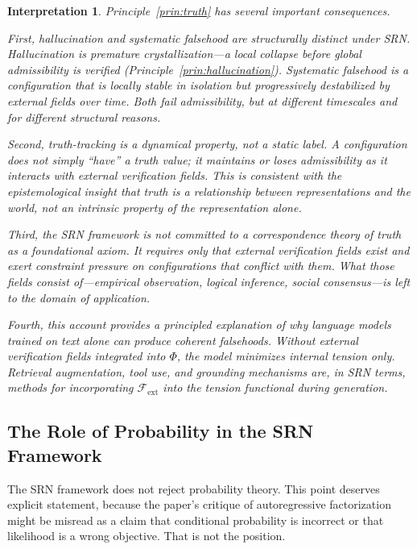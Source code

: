 \documentclass[11pt, a4paper]{article}
\theoremstyle{srn}
\theoremstyle{srnremark}
\newtheorem{interpretation}{Interpretation}[section]
\newcommand{\Phiten}{\varPhi}            %
\begin{document}
\begin{interpretation}
Principle~\ref{prin:truth} has several important consequences.

First, \emph{hallucination and systematic falsehood are structurally
distinct under SRN}.
Hallucination is premature crystallization---a local collapse before
global admissibility is verified (Principle~\ref{prin:hallucination}).
Systematic falsehood is a configuration that is locally stable in
isolation but progressively destabilized by external fields over time.
Both fail admissibility, but at different timescales and for different
structural reasons.

Second, \emph{truth-tracking is a dynamical property}, not a static
label.
A configuration does not simply ``have'' a truth value; it maintains
or loses admissibility as it interacts with external verification
fields.
This is consistent with the epistemological insight that truth is a
relationship between representations and the world, not an intrinsic
property of the representation alone.

Third, \emph{the SRN framework is not committed to a correspondence
theory of truth as a foundational axiom}.
It requires only that external verification fields exist and exert
constraint pressure on configurations that conflict with them.
What those fields consist of---empirical observation, logical inference,
social consensus---is left to the domain of application.

Fourth, this account provides a principled explanation of why
language models trained on text alone can produce coherent falsehoods.
Without external verification fields integrated into $\Phiten$, the
model minimizes internal tension only.
Retrieval augmentation, tool use, and grounding mechanisms are, in SRN
terms, methods for incorporating $\mathcal{F}_{\mathrm{ext}}$ into
the tension functional during generation.
\end{interpretation}


\subsection{The Role of Probability in the SRN Framework}

The SRN framework does not reject probability theory.
This point deserves explicit statement, because the paper's critique of
autoregressive factorization might be misread as a claim that
conditional probability is incorrect or that likelihood is a wrong
objective.
That is not the position.
\end{document}
